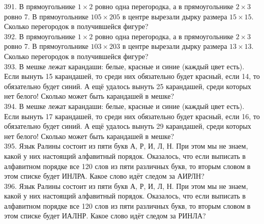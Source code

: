 391. В прямоугольнике $1\times2$ ровно одна перегородка, а в прямоугольнике $2\times3$ ровно 7. В прямоугольнике $105\times205$ в центре вырезали
дырку размера $15\times15.$ Сколько перегородок в получившейся фигуре?\\
392. В прямоугольнике $1\times2$ ровно одна перегородка, а в прямоугольнике $2\times3$ ровно 7. В прямоугольнике $103\times203$ в центре вырезали
дырку размера $13\times13.$ Сколько перегородок в получившейся фигуре?\\
393. В мешке лежат карандаши: белые, красные и синие (каждый цвет есть). Если вынуть 15 карандашей, то среди них обязательно будет красный, если 14, то обязательно будет синий. А ещё удалось вынуть 25 карандашей, среди которых нет белого! Сколько может быть карандашей в мешке?\\
394. В мешке лежат карандаши: белые, красные и синие (каждый цвет есть). Если вынуть 17 карандашей, то среди них обязательно будет красный, если 16, то обязательно будет синий. А ещё удалось вынуть 29 карандашей, среди которых нет белого! Сколько может быть карандашей в мешке?\\
395. Язык Ралины состоит из пяти букв А, Р, И, Л, Н. При этом мы не знаем, какой у них настоящий алфавитный порядок. Оказалось, что если выписать в алфавитном порядке все 120 слов из пяти различных букв, то вторым словом в этом списке будет ИНЛРА. Какое слово идёт следом за АИРЛН?\\
396. Язык Ралины состоит из пяти букв А, Р, И, Л, Н. При этом мы не знаем, какой у них настоящий алфавитный порядок. Оказалось, что если выписать в алфавитном порядке все 120 слов из пяти различных букв, то вторым словом в этом списке будет ИАЛНР. Какое слово идёт следом за РИНЛА?
